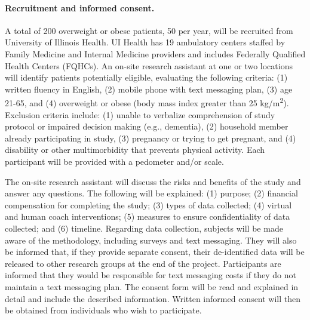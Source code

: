 \paragraph{Recruitment and informed consent.} A total of 200 overweight or obese  patients, 50 per year, will be recruited  from University of Illinois Health. 
UI Health has 19 ambulatory centers staffed by Family Medicine and Internal Medicine providers and includes Federally Qualified Health Centers (FQHCs). An on-site research assistant at one or two locations will identify patients potentially eligible, evaluating the following criteria: (1) written fluency in English, (2) mobile phone with text messaging plan, (3) age 21-65, and (4) overweight or obese (body mass index greater than 25 kg/m\textsuperscript{2}). Exclusion criteria include: (1) unable to verbalize comprehension of study protocol or impaired decision making (e.g., dementia), (2) household member already participating in study, (3) pregnancy or trying to get pregnant, and (4) disability or other multimorbidity that prevents physical activity.  Each participant will be provided with a pedometer and/or scale.

 The on-site research assistant will  discuss the risks and benefits of the study and answer any questions. The following will be explained: (1)  purpose; (2) financial compensation for completing the study; (3) types of data collected; (4) virtual and human coach interventions; (5) measures to ensure confidentiality of data collected; and  (6) timeline. Regarding data collection, subjects will be made aware of the methodology, including surveys and text messaging. They will also be informed that, if they provide separate  consent, their de-identified data will be released to other research groups at the end of the project. Participants are informed that they would be responsible for text messaging costs if they do not maintain a text messaging plan. The consent form  will be read and explained in detail and include the described information. Written informed consent will then be obtained from individuals who wish to participate. 

	
 
